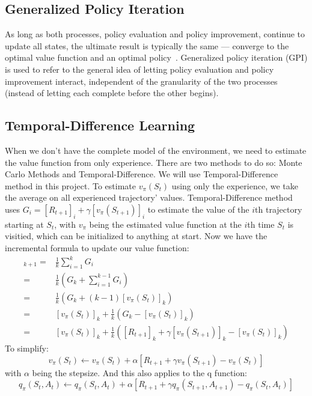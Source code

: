 \documentclass{article}
\begin{document}
\subsection{Generalized Policy Iteration}
\noindent As long as both processes, policy evaluation and policy improvement,
continue to update all states, the ultimate result is typically the 
same --- converge to the optimal value function and an optimal 
policy~\cite{Sutton1998}.
\vspace{3mm}\newline Generalized policy iteration (GPI) is used to refer to the
general idea of letting policy evaluation and policy improvement interact,
independent of the granularity of the two processes~\cite{Sutton1998} 
(instead of letting each complete before the other begins).

\subsection{Temporal-Difference Learning}
\noindent When we don't have the complete model of the environment, we need to 
estimate the value function from only experience. There are two methods to do 
so: Monte Carlo Methods and Temporal-Difference. We will use 
Temporal-Difference method in this project.
\vspace{3mm}\newline To estimate \(v_\pi(S_t)\) using only the experience, we 
take the average on all experienced trajectory' values. Temporal-Difference
method uses \(G_i = [R_{t+1}]_i+\gamma [v_\pi(S_{t+1})]_i\) to estimate the 
value of the \(i\)th trajectory starting at \(S_t\), with \(v_\pi\) being the 
estimated value function at the \(i\)th time \(S_t\) is visitied, which can be 
initialized to anything at start. Now we have the incremental formula to update
our value function:
\begin{align*}
    [v_\pi(S_t)]_{k+1} =& \frac{1}{k}\sum_{i=1}^{k} G_i\\
    =\:& \frac{1}{k}\left(G_k + \sum_{i=1}^{k-1} G_i\right)\\
    =\:& \frac{1}{k}\left(G_k + (k-1)[v_\pi(S_t)]_{k}\right)\\
    =\:& [v_\pi(S_t)]_k + \frac{1}{k}(G_k-[v_\pi(S_t)]_k)\\
    =\:& [v_\pi(S_t)]_k + \frac{1}{k}
    ([R_{t+1}]_k+\gamma [v_\pi(S_{t+1})]_k-[v_\pi(S_t)]_k)
\end{align*}
To simplify:
\[v_\pi(S_t)\longleftarrow v_\pi(S_t)+\alpha
[R_{t+1}+\gamma v_\pi(S_{t+1})-v_\pi(S_t)]\]
with \(\alpha\) being the stepsize. And this also applies to the q function:
\[q_\pi(S_t, A_t)\longleftarrow 
q_\pi(S_t, A_t)+\alpha[R_{t+1}+\gamma q_\pi(S_{t+1}, A_{t+1})-q_\pi(S_t, A_t)]\]
\end{document}
